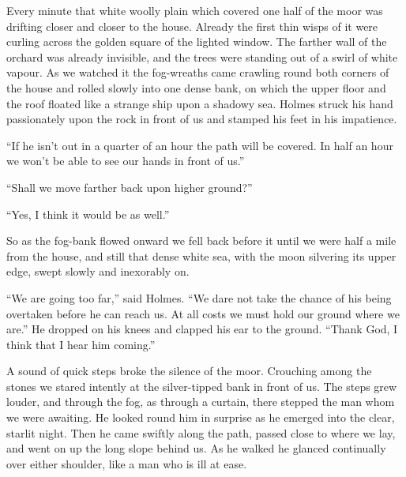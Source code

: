 \documentclass[paper=5.5in:8.5in,BCOR=7mm,twoside,DIV=calc,12pt,usegeometry,openany,chapterprefix,endperiod]{scrbook} %
\begin{document}
Every minute that white woolly plain which covered one half of the moor was drifting closer and closer to the house. Already the first thin wisps of it were curling across the golden square of the lighted window. The farther wall of the orchard was already invisible, and the trees were standing out of a swirl of white vapour. As we watched it the fog-wreaths came crawling round both corners of the house and rolled slowly into one dense bank, on which the upper floor and the roof floated like a strange ship upon a shadowy sea. Holmes struck his hand passionately upon the rock in front of us and stamped his feet in his impatience.

\enquote{If he isn't out in a quarter of an hour the path will be covered. In half an hour we won't be able to see our hands in front of us.}

\enquote{Shall we move farther back upon higher ground?}

\enquote{Yes, I think it would be as well.}

So as the fog-bank flowed onward we fell back before it until we were half a mile from the house, and still that dense white sea, with the moon silvering its upper edge, swept slowly and inexorably on.

\enquote{We are going too far,} said Holmes. \enquote{We dare not take the chance of his being overtaken before he can reach us. At all costs we must hold our ground where we are.} He dropped on his knees and clapped his ear to the ground. \enquote{Thank God, I think that I hear him coming.}

A sound of quick steps broke the silence of the moor. Crouching among the stones we stared intently at the silver-tipped bank in front of us. The steps grew louder, and through the fog, as through a curtain, there stepped the man whom we were awaiting. He looked round him in surprise as he emerged into the clear, starlit night. Then he came swiftly along the path, passed close to where we lay, and went on up the long slope behind us. As he walked he glanced continually over either shoulder, like a man who is ill at ease.
\end{document}
